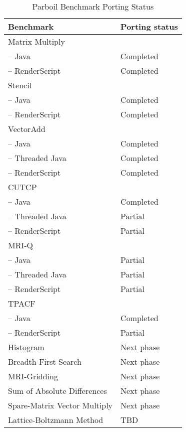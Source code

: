 \begin{table}[h]\small
\centering
\begin{tabular}{ | l | p{2cm} |}
    \hline 
    Benchmark & Porting status \\ \hline
    Matrix Multiply & \\
    \hspace{0.5cm}-- Java & Completed \\
    \hspace{0.5cm}-- RenderScript & Completed \\ \hline
    Stencil & \\
    \hspace{0.5cm}-- Java & Completed \\
    \hspace{0.5cm}-- RenderScript & Completed \\ \hline
    VectorAdd & \\
    \hspace{0.5cm}-- Java & Completed \\
    \hspace{0.5cm}-- Threaded Java & Completed \\
    \hspace{0.5cm}-- RenderScript & Completed \\ \hline
    CUTCP & \\
    \hspace{0.5cm}-- Java & Completed \\
    \hspace{0.5cm}-- Threaded Java & Partial \\
    \hspace{0.5cm}-- RenderScript & Partial \\ \hline
    MRI-Q & \\
    \hspace{0.5cm}-- Java & Partial \\
    \hspace{0.5cm}-- Threaded Java & Partial \\
    \hspace{0.5cm}-- RenderScript & Partial \\ \hline
    TPACF & \\
    \hspace{0.5cm}-- Java & Completed \\
    \hspace{0.5cm}-- RenderScript & Partial \\ \hline  
    Histogram & Next phase \\ \hline
    Breadth-First Search & Next phase\\ \hline
    MRI-Gridding & Next phase \\ \hline
    Sum of Absolute Differences & Next phase \\ \hline
    Spare-Matrix Vector Multiply & Next phase \\ \hline
    Lattice-Boltzmann Method & TBD \\ \hline
    \hline
\end{tabular}
\caption{Parboil Benchmark Porting Status}
\label{table:parboil}
\end{table}


